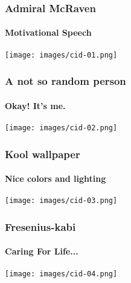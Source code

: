 \documentclass{beamer}
\begin{document}

\begin{frame}
  \frametitle{\hspace{4mm}Admiral McRaven}%
  \framesubtitle{\hspace{4mm}Motivational Speech}%
  \texttt{[image: images/cid-01.png]}%
\end{frame}%

\begin{frame}
  \frametitle{\hspace{4mm}A not so random person}%
  \framesubtitle{\hspace{4mm}Okay! It's me.}%
  \texttt{[image: images/cid-02.png]}%
\end{frame}%

\begin{frame}
  \frametitle{\hspace{4mm}Kool wallpaper}%
  \framesubtitle{\hspace{4mm}Nice colors and lighting}%
  \texttt{[image: images/cid-03.png]}%
\end{frame}%

\begin{frame}
  \frametitle{\hspace{4mm}Fresenius-kabi}%
  \framesubtitle{\hspace{4mm}Caring For Life...}%
  \texttt{[image: images/cid-04.png]}%
\end{frame}%

\end{document}

